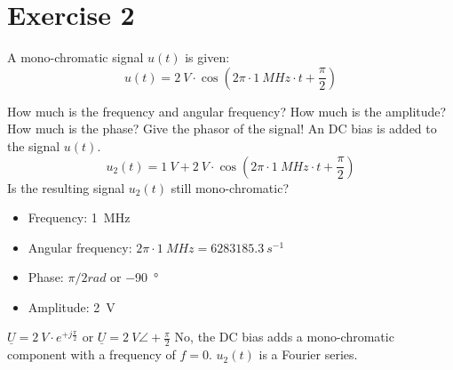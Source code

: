 %
%
%

{}
\section*{Exercise 2}

\begin{question}[subtitle={Mono-chromatic Signals}]
	A mono-chromatic signal $u(t)$ is given:
	\begin{equation*}
		u(t) = \SI{2}{V} \cdot \cos\left(2 \pi \cdot \SI{1}{MHz} \cdot t + \frac{\pi}{2} \right)
	\end{equation*}
	\begin{tasks}
		\task
		How much is the frequency and angular frequency? How much is the amplitude? How much is the phase?
		\task
		Give the phasor of the signal!
		\task
		An DC bias is added to the signal $u(t)$.
		\begin{equation*}
			u_2(t) = \SI{1}{V} + \SI{2}{V} \cdot \cos\left(2 \pi \cdot \SI{1}{MHz} \cdot t + \frac{\pi}{2} \right)
		\end{equation*}
		Is the resulting signal $u_2(t)$ still mono-chromatic?
	\end{tasks}
\end{question}

\begin{solution}
	\begin{tasks}
		\task
		\begin{itemize}
			\item Frequency: \SI{1}{MHz}
			\item Angular frequency: $2 \pi \cdot \SI{1}{MHz} = \SI{6283185.3}{s^{-1}}$
			\item Phase: $\pi/2 \si{rad}$ or \SI{-90}{\degree}
			\item Amplitude: \SI{2}{V}
		\end{itemize}
		\task
		$\underline{U} = \SI{2}{V} \cdot e^{+j \frac{\pi}{2}}$ or $\underline{U} = \SI{2}{V} \angle +\frac{\pi}{2}$
		\task
		No, the DC bias adds a mono-chromatic component with a frequency of $f = 0$. $u_2(t)$ is a Fourier series.
	\end{tasks}
\end{solution}

